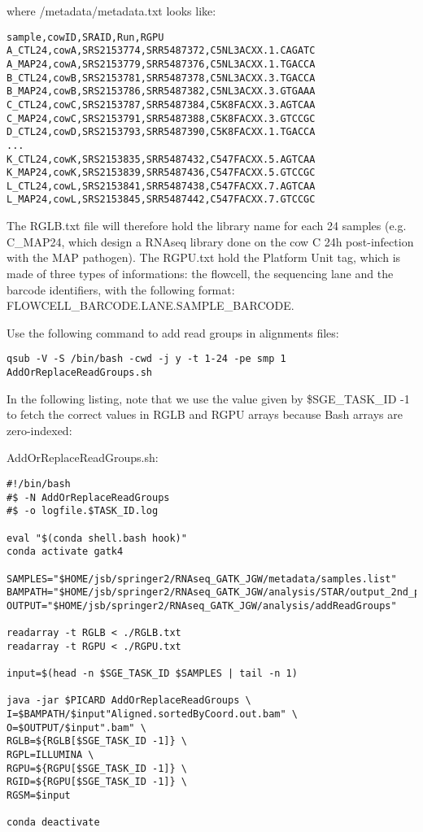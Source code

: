 where /metadata/metadata.txt looks like:

\begin{verbatim}
sample,cowID,SRAID,Run,RGPU
A_CTL24,cowA,SRS2153774,SRR5487372,C5NL3ACXX.1.CAGATC
A_MAP24,cowA,SRS2153779,SRR5487376,C5NL3ACXX.1.TGACCA
B_CTL24,cowB,SRS2153781,SRR5487378,C5NL3ACXX.3.TGACCA
B_MAP24,cowB,SRS2153786,SRR5487382,C5NL3ACXX.3.GTGAAA
C_CTL24,cowC,SRS2153787,SRR5487384,C5K8FACXX.3.AGTCAA
C_MAP24,cowC,SRS2153791,SRR5487388,C5K8FACXX.3.GTCCGC
D_CTL24,cowD,SRS2153793,SRR5487390,C5K8FACXX.1.TGACCA
...
K_CTL24,cowK,SRS2153835,SRR5487432,C547FACXX.5.AGTCAA
K_MAP24,cowK,SRS2153839,SRR5487436,C547FACXX.5.GTCCGC
L_CTL24,cowL,SRS2153841,SRR5487438,C547FACXX.7.AGTCAA
L_MAP24,cowL,SRS2153845,SRR5487442,C547FACXX.7.GTCCGC
\end{verbatim}


The RGLB.txt file will therefore hold the library name for each 24 samples (e.g. C\_MAP24, which design a RNAseq library done on the cow C 24h post-infection with the MAP pathogen). The RGPU.txt hold the Platform Unit tag, which is made of three types of informations: the flowcell, the sequencing lane and the barcode identifiers, with the following format: {FLOWCELL\_BARCODE}.{LANE}.{SAMPLE\_BARCODE}. 


Use the following command to add read groups in alignments files:

\begin{verbatim}
qsub -V -S /bin/bash -cwd -j y -t 1-24 -pe smp 1 AddOrReplaceReadGroups.sh
\end{verbatim}

In the following listing, note that we use the value given by \$SGE\_TASK\_ID -1 to fetch the correct values in RGLB and RGPU arrays because Bash arrays are zero-indexed:

\noindent AddOrReplaceReadGroups.sh:
\begin{verbatim}
#!/bin/bash
#$ -N AddOrReplaceReadGroups
#$ -o logfile.$TASK_ID.log

eval "$(conda shell.bash hook)"
conda activate gatk4

SAMPLES="$HOME/jsb/springer2/RNAseq_GATK_JGW/metadata/samples.list"
BAMPATH="$HOME/jsb/springer2/RNAseq_GATK_JGW/analysis/STAR/output_2nd_pass"
OUTPUT="$HOME/jsb/springer2/RNAseq_GATK_JGW/analysis/addReadGroups"

readarray -t RGLB < ./RGLB.txt
readarray -t RGPU < ./RGPU.txt

input=$(head -n $SGE_TASK_ID $SAMPLES | tail -n 1)

java -jar $PICARD AddOrReplaceReadGroups \
I=$BAMPATH/$input"Aligned.sortedByCoord.out.bam" \
O=$OUTPUT/$input".bam" \
RGLB=${RGLB[$SGE_TASK_ID -1]} \
RGPL=ILLUMINA \
RGPU=${RGPU[$SGE_TASK_ID -1]} \
RGID=${RGPU[$SGE_TASK_ID -1]} \
RGSM=$input

conda deactivate
\end{verbatim}

